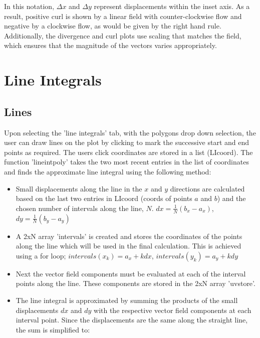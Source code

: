 \documentclass[11]{report}
\begin{document}
In this notation, $\Delta x$ and $\Delta y$ represent displacements within the inset axis. As a result, positive curl is shown by a linear field with counter-clockwise flow and negative by a clockwise flow, as would be given by the right hand rule. Additionally, the divergence and curl plots use scaling that matches the field, which ensures that the magnitude of the vectors varies appropriately. 

\section{Line Integrals}
\subsection{Lines}

Upon selecting the 'line integrals' tab, with the polygons drop down selection, the user can draw lines on the plot by clicking to mark the successive start and end points as required. The users click coordinates are stored in a list (LI\textunderscore coord). The function 'line\textunderscore int\textunderscore poly' takes the two most recent entries in the list of coordinates and finds the approximate line integral using the following method:

\begin{itemize}
	\item Small displacements along the line in the $x$ and $y$ directions are calculated based on the last two entries in LI\textunderscore coord (coords of points $a$ and $b$) and the chosen number of intervals along the line, $N$. $dx = \frac{1}{N} (b_x - a_x)$,  $dy = \frac{1}{N} (b_y - a_y)$
	\item A 2xN array 'intervals' is created and stores the coordinates of the points along the line which will be used in the final calculation. This is achieved using a for loop; $intervals(x_k) = a_x + k dx$, $intervals(y_k) = a_y + k dy$
	\item Next the vector field components must be evaluated at each of the interval points along the line. These components are stored in the 2xN array 'uv\textunderscore store'. 
	\item The line integral is approximated by summing the products of the small displacements $dx$ and $dy$ with the respective vector field components at each interval point. Since the displacements are the same along the straight line, the sum is simplified to:
\end{itemize}
\end{document}
